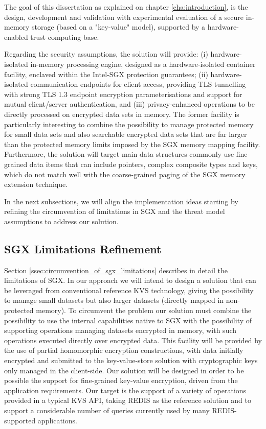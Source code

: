 The goal of this dissertation as explained on chapter \ref{cha:introduction}, is the design, development and validation with experimental evaluation of a secure in-memory storage (based on a "key-value" model), supported by a hardware-enabled trust computing base.

Regarding the security assumptions, the solution will provide: (i) hardware-isolated in-memory processing engine, designed as a hardware-isolated container facility, enclaved within the Intel-SGX protection guarantees; (ii) hardware-isolated communication endpoints for client access, providing TLS tunnelling with strong TLS 1.3 endpoint encryption parameterisations and support for mutual client/server authentication, and (iii) privacy-enhanced operations to be directly processed on encrypted data sets in memory. The former facility is particularly interesting to combine the possibility to manage protected memory for small data sets and also searchable encrypted data sets that are far larger than the protected memory limits imposed by the SGX memory mapping facility. Furthermore, the solution will target main data structures commonly use fine-grained data items that can include pointers, complex composite types and keys, which do not match well with the coarse-grained paging of the SGX memory extension technique.

In the next subsections, we will align the implementation ideas starting by refining the circumvention of limitations in SGX and the threat model assumptions to address our solution.

\subsection{\gls{SGX} Limitations Refinement}
\label{ssec:sgx_limitations_refinement}

Section \ref{ssec:circumvention_of_sgx_limitations} describes in detail the limitations of \gls{SGX}. In our approach we will intend to design a solution that can be leveraged from conventional reference KVS technology, giving the possibility to manage small datasets but also larger datasets (directly mapped in non-protected memory). To circumvent the problem our solution must combine the possibility to use the internal capabilities native to SGX with the possibility of supporting operations managing datasets encrypted in memory, with such operations executed directly over encrypted data. This facility will be provided by the use of partial homomorphic encryption constructions, with data initially encrypted and submitted to the key-value-store solution with cryptographic keys only managed in the client-side. Our solution will be designed in order to be possible the support for fine-grained key-value encryption, driven from the application requirements. Our target is the support of a variety of operations provided in a typical KVS API, taking REDIS as the reference solution and to support a considerable number of queries currently used by many REDIS-supported applications.

